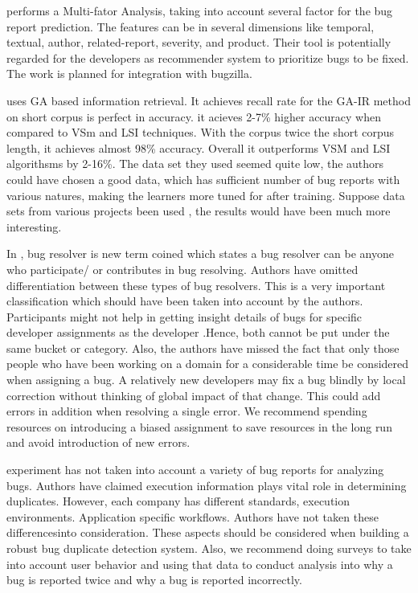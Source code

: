 \documentclass[]{sig-alternate-05-2015}
\begin{document}
\cite{Tian2013} performs a Multi-fator Analysis, taking into account several factor for the bug report prediction. The features can be in several dimensions like temporal, textual, author, related-report, severity, and product. Their tool is potentially regarded for the developers as recommender system to prioritize bugs to be fixed. The work is planned for integration with bugzilla. \newline

\cite{Klabbankoh2010} uses GA based information retrieval. It achieves  recall rate for the GA-IR method on short corpus is perfect in accuracy. it acieves 2-7\% higher accuracy when compared to VSm and LSI techniques. With the corpus twice the short corpus length, it achieves almost 98\% accuracy. Overall it outperforms VSM and LSI algorithsms by 2-16\%. The data set they used seemed quite low, the authors could have chosen a good data, which has sufficient number of bug reports with various natures, making the learners more tuned for after training. Suppose data sets from various projects been used , the results would have been much more interesting. \newline

In \cite{Xia2013}, bug resolver is new term coined which states a bug resolver can be anyone who participate/ or contributes in bug resolving. Authors have omitted differentiation between these types of bug resolvers. This is a very important classification which should have been taken into account by the authors. Participants might not help in getting insight details of bugs for specific developer assignments as the developer .Hence, both cannot be put under the same bucket or category. Also, the authors have missed the fact that only those people who have been working on a domain for a considerable time be considered when assigning a bug. A relatively new developers may fix a bug blindly by local correction without thinking of global impact of that change. This could add errors in addition when resolving a single error. We recommend spending resources on introducing a biased assignment to save resources in the long run and avoid introduction of new errors. 

\cite{Wang2008} experiment has not taken into account a variety of bug reports for analyzing bugs. Authors have claimed execution information plays vital role in determining duplicates. However, each company has different standards, execution environments. Application specific workflows. Authors have not taken these differencesinto consideration. These aspects should be considered when building a robust bug duplicate detection system. Also, we recommend doing surveys to take into account user behavior and using that data to conduct analysis into why a bug is reported twice and why a bug is reported incorrectly. 
\end{document}
